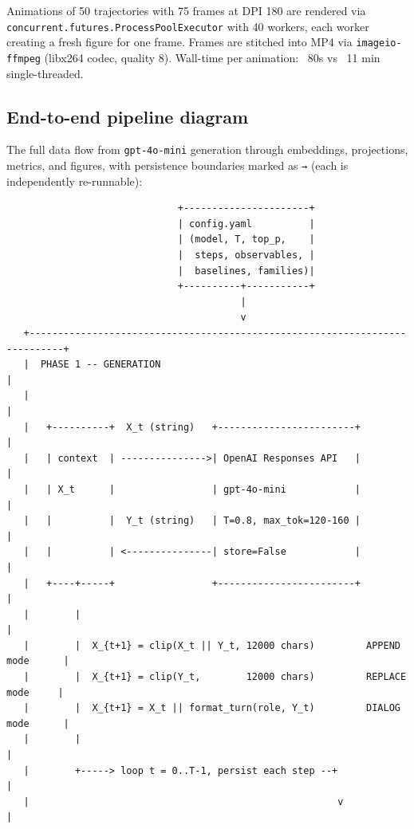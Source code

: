 \documentclass{article}
\theoremstyle{plain}
\theoremstyle{definition}
\begin{document}
Animations of 50 trajectories with 75 frames at DPI 180 are rendered
via \texttt{concurrent.futures.ProcessPoolExecutor} with 40 workers, each
worker creating a fresh figure for one frame. Frames are stitched into
MP4 via \texttt{imageio-ffmpeg} (libx264 codec, quality 8). Wall-time
per animation: ~80s vs ~11 min single-threaded.

\subsection{End-to-end pipeline diagram}

The full data flow from \texttt{gpt-4o-mini} generation through embeddings,
projections, metrics, and figures, with persistence boundaries marked
as \texttt{→} (each is independently re-runnable):

\begin{verbatim}
                              +----------------------+
                              | config.yaml          |
                              | (model, T, top_p,    |
                              |  steps, observables, |
                              |  baselines, families)|
                              +----------+-----------+
                                         |
                                         v
   +----------------------------------------------------------------------------+
   |  PHASE 1 -- GENERATION                                                      |
   |                                                                            |
   |   +----------+  X_t (string)   +------------------------+                  |
   |   | context  | --------------->| OpenAI Responses API   |                  |
   |   | X_t      |                 | gpt-4o-mini            |                  |
   |   |          |  Y_t (string)   | T=0.8, max_tok=120-160 |                  |
   |   |          | <---------------| store=False            |                  |
   |   +----+-----+                 +------------------------+                  |
   |        |                                                                   |
   |        |  X_{t+1} = clip(X_t || Y_t, 12000 chars)         APPEND mode      |
   |        |  X_{t+1} = clip(Y_t,        12000 chars)         REPLACE mode     |
   |        |  X_{t+1} = X_t || format_turn(role, Y_t)         DIALOG mode      |
   |        |                                                                   |
   |        +-----> loop t = 0..T-1, persist each step --+                      |
   |                                                      v                     |

\end{verbatim}
\end{document}
